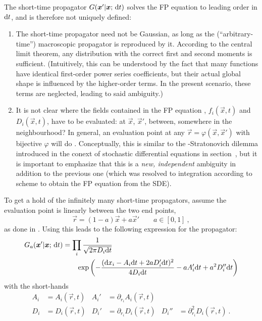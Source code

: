 The short-time propagator \(G(\boldsymbol{x}'|\boldsymbol{x};\,\mathrm{d} t)\) solves the FP equation to leading order in \(\mathrm{d} t\), and is therefore not uniquely defined:
%
\begin{enumerate}
	\item The short-time propagator need not be Gaussian, as long as the (``arbitrary-time'') macroscopic propagator is reproduced by it. According to the central limit theorem, any distribution with the correct first and second moments is sufficient. (Intuitively, this can be understood by the fact that many functions have identical first-order power series coefficients, but their actual global shape is influenced by the higher-order terms. In the present scenario, these terms are neglected, leading to said ambiguity.)
	\item It is not clear where the fields contained in the FP equation , \(f_i(\vec x,t)\) and \(D_i(\vec x,t)\), have to be evaluated: at \(\vec x\), \(\vec x'\), between, somewhere in the neighbourhood? In general, an evaluation point at any \(\vec r = \varphi(\vec x,\vec x')\) with bijective \(\varphi\) will do \cite{wissel}. Conceptually, this is similar to the \Ito{}-Stratonovich dilemma introduced in the conext of stochastic differential equations in section~, but it is important to emphasize that this is a \emph{new, independent} ambiguity in addition to the previous one (which was resolved to integration according to \Ito{} scheme to obtain the FP equation from the SDE).
\end{enumerate}
%
To get a hold of the infinitely many short-time propagators, assume the evaluation point is linearly between the two end points,
%
\begin{equation}
	\vec r = (1-a)\vec x + a\vec x' \qquad a\in[0,1] ~,
\end{equation}
%
as done in \cite{sf}. Using \cite{wissel, donoso} this leads to the following expression for the propagator:
%
\begin{equation}\begin{split}
	\label{eqn:propagator general}
	G_a(\boldsymbol{x}'|\boldsymbol{x};\,\mathrm{d} t)
	&= \prod_i \frac1{\sqrt{2\pi D_i\mathrm{d} t}}
	\\&\qquad
	\operatorname{exp}\left(
		- \frac{(\mathrm{d} x_i-A_i\mathrm{d} t+2aD_i'\mathrm{d} t)^2}{4D_i\mathrm{d} t}
		- a A_i'\mathrm{d} t
		+ a^2 D_i''\mathrm{d} t
		\right)
\end{split}\end{equation}
%
with the short-hands
%
\begin{align*}
	A_i &= A_i(\vec r,t)  &  A_i' &= \partial_{r_i}A_i(\vec r,t) \\
	D_i &= D_i(\vec r,t)  &  D_i' &= \partial_{r_i}D_i(\vec r,t)  &  D_i'' &= \partial_{r_i}^2D_i(\vec r,t) ~.
\end{align*}


